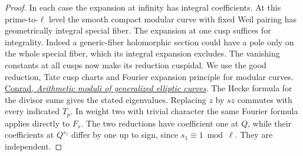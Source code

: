 \documentclass[a4paper,11pt]{article}
\theoremstyle{definition}
\theoremstyle{remark}
\numberwithin{equation}{section}
\begin{document}
\begin{proof}
In each case the expansion at infinity has integral coefficients.
At this prime-to-\(\ell\) level the smooth compact modular curve
with fixed Weil pairing has geometrically integral special fiber.
The expansion at one cusp suffices for integrality. Indeed a
generic-fiber holomorphic section could have a pole only on
the whole special fiber, which its integral expansion excludes.
The vanishing constants at all cusps now make its reduction
cuspidal. We use the good reduction, Tate cusp charts and
Fourier expansion principle for modular curves.
\href{https://virtualmath1.stanford.edu/~conrad/papers/kmpaper.pdf}{Conrad,
\emph{Arithmetic moduli of generalized elliptic curves}}.
The Hecke formula for the divisor sums gives the stated eigenvalues.
Replacing \(z\) by \(sz\) commutes with every indicated \(T_p\).
In weight two with trivial character the same Fourier formula
applies directly to \(F_s\). The two reductions have coefficient
one at \(Q\), while their coefficients at \(Q^{s_1}\) differ by
one up to sign, since \(s_1\equiv1\bmod\ell\). They are independent.
\end{proof}
\end{document}

